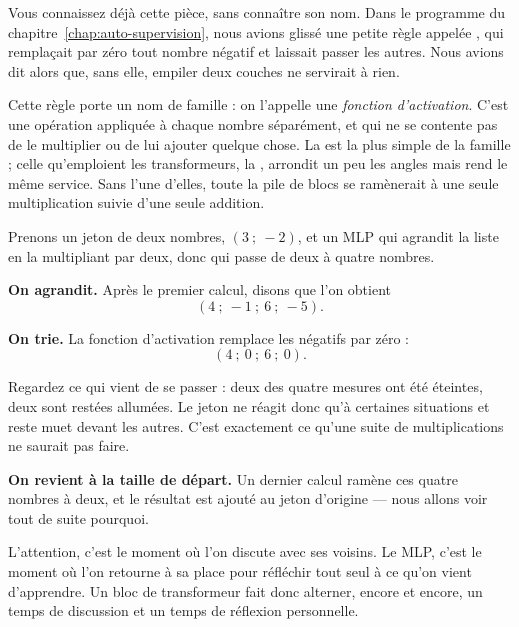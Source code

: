 \begin{definition}
Vous connaissez déjà cette pièce, sans connaître son nom. Dans le programme
du chapitre~\ref{chap:auto-supervision}, nous avions glissé une petite règle
appelée , qui remplaçait par zéro tout nombre négatif et
laissait passer les autres. Nous avions dit alors que, sans elle, empiler
deux couches ne servirait à rien.

Cette règle porte un nom de famille : on l'appelle une \emph{fonction
d'activation}. C'est une opération appliquée à chaque nombre séparément, et
qui ne se contente pas de le multiplier ou de lui ajouter quelque chose. La
 est la plus simple de la famille ; celle qu'emploient les
transformeurs, la , arrondit un peu les angles mais rend le
même service. Sans l'une d'elles, toute la pile de blocs se ramènerait à une
seule multiplication suivie d'une seule addition.
\end{definition}

\begin{exemple}
Prenons un jeton de deux nombres, $(3 \ ; \ -2)$, et un MLP qui agrandit la
liste en la multipliant par deux, donc qui passe de deux à quatre nombres.

\textbf{On agrandit.} Après le premier calcul, disons que l'on obtient
\[ (4 \ ; \ -1 \ ; \ 6 \ ; \ -5). \]

\textbf{On trie.} La fonction d'activation remplace les négatifs par zéro :
\[ (4 \ ; \ 0 \ ; \ 6 \ ; \ 0). \]

Regardez ce qui vient de se passer : deux des quatre mesures ont été
éteintes, deux sont restées allumées. Le jeton ne réagit donc qu'à certaines
situations et reste muet devant les autres. C'est exactement ce qu'une suite
de multiplications ne saurait pas faire.

\textbf{On revient à la taille de départ.} Un dernier calcul ramène ces
quatre nombres à deux, et le résultat est ajouté au jeton d'origine — nous
allons voir tout de suite pourquoi.
\end{exemple}

\begin{intuition}
L'attention, c'est le moment où l'on discute avec ses voisins. Le MLP, c'est
le moment où l'on retourne à sa place pour réfléchir tout seul à ce qu'on
vient d'apprendre. Un bloc de transformeur fait donc alterner, encore et
encore, un temps de discussion et un temps de réflexion personnelle.
\end{intuition}

